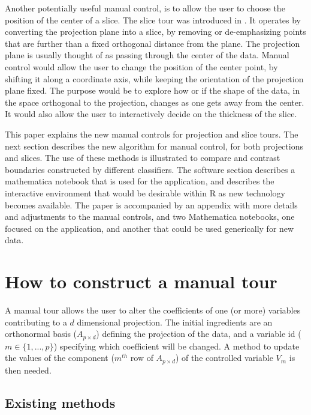\documentclass[]{interact}
\theoremstyle{plain}%
\theoremstyle{definition}
\theoremstyle{remark}
\begin{document}
Another potentially useful manual control, is to allow the user to
choose the position of the center of a slice. The slice tour was
introduced in \citet{slicetour}. It operates by converting the
projection plane into a slice, by removing or de-emphasizing points that
are further than a fixed orthogonal distance from the plane. The
projection plane is usually thought of as passing through the center of
the data. Manual control would allow the user to change the position of
the center point, by shifting it along a coordinate axis, while keeping
the orientation of the projection plane fixed. The purpose would be to
explore how or if the shape of the data, in the space orthogonal to the
projection, changes as one gets away from the center. It would also
allow the user to interactively decide on the thickness of the slice.

This paper explains the new manual controls for projection and slice
tours. The next section describes the new algorithm for manual control,
for both projections and slices. The use of these methods is illustrated
to compare and contrast boundaries constructed by different classifiers.
The software section describes a mathematica notebook that is used for
the application, and describes the interactive environment that would be
desirable within R as new technology becomes available. The paper is
accompanied by an appendix with more details and adjustments to the
manual controls, and two Mathematica notebooks, one focused on the
application, and another that could be used generically for new data.

\hypertarget{sec:method}{%
\section{How to construct a manual tour}\label{sec:method}}

A manual tour allows the user to alter the coefficients of one (or more)
variables contributing to a \(d\) dimensional projection. The initial
ingredients are an orthonormal basis (\(A_{p\times d}\)) defining the
projection of the data, and a variable id (\(m \in \{1, ..., p\}\))
specifying which coefficient will be changed. A method to update the
values of the component (\(m^{th}\) row of \(A_{p\times d}\)) of the
controlled variable \(V_m\) is then needed.

\hypertarget{existing-methods}{%
\subsection{Existing methods}\label{existing-methods}}
\end{document}

